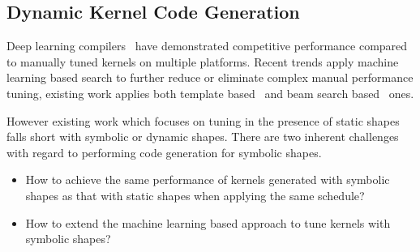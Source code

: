 %


%
\subsection{Dynamic Kernel Code Generation}
\label{sec:compliation:codegen}
Deep learning compilers~\citep{tvm_osdi18, halide} have demonstrated competitive performance compared to manually
  tuned kernels on multiple platforms.
Recent trends apply machine learning based search to further reduce or eliminate complex manual performance tuning,
  existing work applies both template based~\citep{chen2018learning, zheng2020flextensor} and beam search based~\citep{adams2019learning} ones.

However existing work which focuses on tuning in the presence of static shapes falls short with symbolic or dynamic shapes.
There are two inherent challenges with regard to performing code generation for symbolic shapes.
\begin{itemize}
    \item How to achieve the same performance of kernels generated with symbolic shapes as that with static shapes when applying the same schedule?
    \item How to extend the machine learning based approach to tune kernels with symbolic shapes?
\end{itemize}

